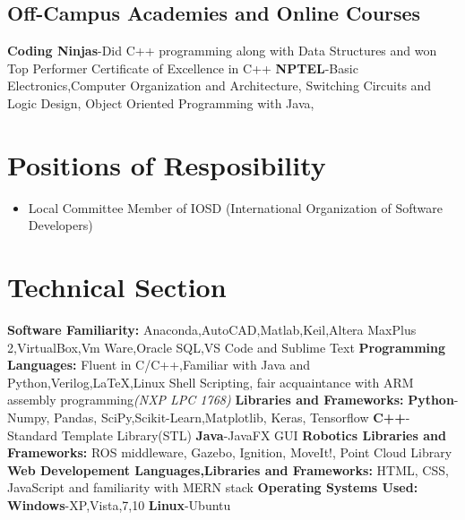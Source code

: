 \documentclass[a4paper,12pt]{article}
\begin{document}
    \subsection*{Off-Campus Academies and Online Courses}
    \textbf{Coding Ninjas}-Did C++ programming along with Data Structures 
    and won Top Performer Certificate of Excellence in C++
    \newline
    \textbf{NPTEL}-Basic Electronics,Computer Organization and Architecture, 
    Switching Circuits and Logic Design, Object Oriented Programming with Java,
    
\section*{Positions of Resposibility}
    \begin{itemize}
        \item Local Committee Member of IOSD
        (International Organization of Software Developers)
    \end{itemize}


\section*{Technical Section}
\textbf{Software Familiarity: }
\newline
Anaconda,AutoCAD,Matlab,Keil,Altera MaxPlus 2,VirtualBox,Vm Ware,Oracle SQL,VS Code and Sublime Text 
\newline
\textbf{Programming Languages: }
\newline
Fluent in C/C++,Familiar with Java and Python,Verilog,LaTeX,Linux Shell Scripting,
fair acquaintance with ARM assembly programming\textit{(NXP LPC 1768)}
\newline
\textbf{Libraries and Frameworks: }
\newline
\textbf{Python}-Numpy, Pandas, SciPy,Scikit-Learn,Matplotlib, Keras, Tensorflow    
\newline
\textbf{C++}-Standard Template Library(STL)    
\newline
\textbf{Java}-JavaFX GUI    
\newline
\textbf{Robotics Libraries and Frameworks: }
\newline
ROS middleware, Gazebo, Ignition, MoveIt!, Point Cloud Library
\newline
\textbf{Web Developement Languages,Libraries and Frameworks: }
\newline
HTML, CSS, JavaScript and familiarity with MERN stack 
\newline
\textbf{Operating Systems Used: }
\newline
\textbf{Windows}-XP,Vista,7,10 
\textbf{Linux}-Ubuntu
\end{document}
